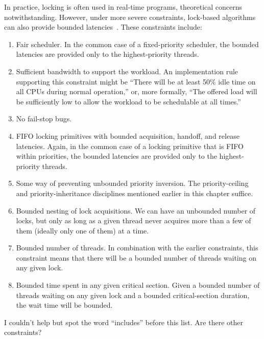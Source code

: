In practice, locking is often used in real-time programs, theoretical
concerns notwithstanding.
However, under more severe constraints, lock-based
algorithms can also provide bounded latencies~\cite{BjoernBrandenburgPhD}.
These constraints include:

\begin{enumerate}
\item	Fair scheduler.
	In the common case of a fixed-priority scheduler, the bounded
	latencies are provided only to the highest-priority threads.
\item	Sufficient bandwidth to support the workload.
	An implementation rule supporting this constraint might be
	``There will be at least 50\% idle time on all CPUs
	during normal operation,''
	or, more formally, ``The offered load will be sufficiently low
	to allow the workload to be schedulable at all times.''
\item	No fail-stop bugs.
\item	FIFO locking primitives with bounded acquisition, handoff,
	and release latencies.
	Again, in the common case of a locking primitive that is FIFO
	within priorities, the bounded latencies are provided only
	to the highest-priority threads.
\item	Some way of preventing unbounded priority inversion.
	The priority-ceiling and priority-inheritance disciplines
	mentioned earlier in this chapter suffice.
\item	Bounded nesting of lock acquisitions.
	We can have an unbounded number of locks, but only as long as a
	given thread never acquires more than a few of them (ideally only
	one of them) at a time.
\item	Bounded number of threads.
	In combination with the earlier constraints, this constraint means
	that there will be a bounded number of threads waiting on any
	given lock.
\item	Bounded time spent in any given critical section.
	Given a bounded number of threads waiting on any given lock and
	a bounded critical-section duration, the wait time will be bounded.
\end{enumerate}

\QuickQuiz{}
	I couldn't help but spot the word ``includes'' before this list.
	Are there other constraints?
 \QuickQuizEnd

